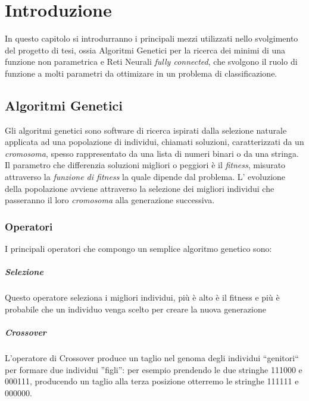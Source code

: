 \documentclass[12pt,a4paper]{report}
\begin{document}
\thispagestyle{empty}
\clearpage\null\newpage

\tableofcontents

\chapter{Introduzione}

In questo capitolo si introdurranno i principali mezzi utilizzati nello svolgimento del progetto di tesi, ossia Algoritmi Genetici per la ricerca dei minimi di una funzione non parametrica e Reti Neurali \textit{fully connected}, che svolgono il ruolo di funzione a molti parametri da ottimizare in un problema di classificazione.

\section{Algoritmi Genetici}\label{alg-gen} 

Gli algoritmi genetici sono software di ricerca ispirati dalla selezione naturale applicata ad una popolazione di individui, chiamati soluzioni, caratterizzati da un \textit{cromosoma}, spesso rappresentato da una lista di numeri binari o da una  stringa.
Il parametro che differenzia soluzioni migliori o peggiori è il \textit{fitness}, misurato attraverso la \textit{funzione di fitness} la quale dipende dal problema.
L' evoluzione della popolazione avviene attraverso la selezione dei migliori individui che passeranno il loro \textit{cromosoma} alla generazione successiva.

\subsection{Operatori}

\cite{genetic-algorithm-mitchell}
I principali operatori che compongo un semplice algoritmo genetico sono:

\paragraph{Selezione} Questo operatore seleziona i migliori individui, più è alto è il fitness e più è probabile che un individuo venga scelto per creare la nuova generazione

\paragraph{Crossover} L'operatore di Crossover produce un taglio nel genoma degli individui ``genitori`` per formare due individui ''figli'': per esempio prendendo le due stringhe 111000 e 000111, producendo un taglio alla terza posizione otterremo le stringhe  111111 e 000000.
\end{document}
